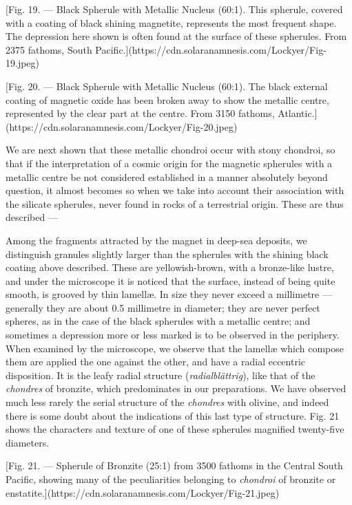 \documentclass[a4paper, 12pt, oneside, polutonikogreek, english]{article}
\begin{document}
[Fig. 19. --- Black Spherule with Metallic Nucleus (60:1). This spherule, covered with a coating of black shining magnetite, represents the most frequent shape. The depression here shown is often found at the surface of these spherules. From 2375 fathoms, South Pacific.](https://cdn.solaranamnesis.com/Lockyer/Fig-19.jpeg)

[Fig. 20. --- Black Spherule with Metallic Nucleus (60:1). The black external coating of magnetic oxide has been broken away to show the metallic centre, represented by the clear part at the centre. From 3150 fathoms, Atlantic.](https://cdn.solaranamnesis.com/Lockyer/Fig-20.jpeg)

We are next shown that these metallic chondroi occur with stony chondroi, so that if the interpretation of a cosmic origin for the magnetic spherules with a metallic centre be not considered established in a manner absolutely beyond question, it almost becomes so when we take into account their association with the silicate spherules, never found in rocks of a terrestrial origin. These are thus described ---

Among the fragments attracted by the magnet in deep-sea deposits, we distinguish granules slightly larger than the spherules with the shining black coating above described. These are yellowish-brown, with a bronze-like lustre, and under the microscope it is noticed that the surface, instead of being quite smooth, is grooved by thin lamellæ. In size they never exceed a millimetre --- generally they are about 0.5 millimetre in diameter; they are never perfect spheres, as in the case of the black spherules with a metallic centre; and sometimes a depression more or less marked is to be observed in the periphery. When examined by the microscope, we observe that the lamellæ which compose them are applied the one against the other, and have a radial eccentric disposition. It is the leafy radial structure (\emph{radialblättrig}), like that of the \emph{chondres} of bronzite, which predominates in our preparations. We have observed much less rarely the serial structure of the \emph{chondres} with olivine, and indeed there is some doubt about the indications of this last type of structure. Fig. 21 shows the characters and texture of one of these spherules magnified twenty-five diameters.

[Fig. 21. --- Spherule of Bronzite (25:1) from 3500 fathoms in the Central South Pacific, showing many of the peculiarities belonging to \emph{chondroi} of bronzite or enstatite.](https://cdn.solaranamnesis.com/Lockyer/Fig-21.jpeg)
\end{document}
